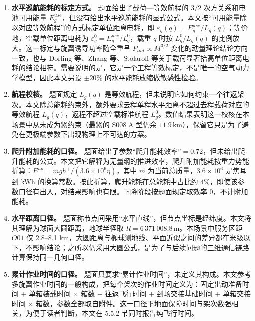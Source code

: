 \documentclass[withoutpreface,bwprint]{format}
\begin{document}
\begin{enumerate}[label=\textbf{假设 \arabic*：}, leftmargin=*]
    \item \textbf{水平巡航能耗的标定方式。} 题面给出了载荷—等效航程的 $3/2$ 次方关系和电池可用能量 $E_g^{use}$，但没有给出水平巡航能耗的显式公式。本文按“可用能量除以对应等效航程”的方式标定单位距离电耗，即 $\varepsilon_g(q)=E_g^{use}/L_g(q)$；等价地，空载单位距离电耗为 $\varepsilon_g^0=E_g^{use}/L_g^0$，载重 $q$ 时按 $L_g^0/L_g(q)$ 的比例放大。这一标定与旋翼诱导功率随全重呈 $P_{ind}\propto M^{3/2}$ 变化的动量理论结论\cite{leishman2006}方向一致，也与 Dorling 等\cite{dorling2017}、Zhang 等\cite{zhang2021}、Stolaroff 等\cite{stolaroff2018}关于载荷显著抬高单位距离电耗的结论相符。需要说明的是，它是一个工程等效标定，不是唯一的空气动力学模型，因此本文另设 $\pm20\%$ 的水平能耗放缩做敏感性检验。

    \item \textbf{航程校核。} 题面规定 $L_g(q)$ 是等效航程，但未说明它如何约束一个往返架次。本文除总能耗约束外，额外要求去程单程水平距离不超过去程载荷对应的等效航程 $L_g(q)$，返程不超过空载标准航程 $L_g^0$。数值结果表明这一校核在本场景中从未成为紧约束（最紧的 S008 A 型仍余 $11.9\,\text{km}$），保留它只是为了避免在更极端参数下出现物理上不可达的方案。

    \item \textbf{爬升附加能耗的口径。} 题面给出了参数“爬升能耗效率”$=0.72$，但未给出爬升能耗的公式。本文把它解释为无量纲的推进效率，爬升附加能耗按重力势能折算：$E^{up}=mgh^+/(3.6\times10^6\eta)$，其中 $m$ 为当前总质量，$3.6\times10^6$ 是焦耳到 kWh 的换算常数。按此折算，爬升能耗在总能耗中占比约 $4\%$，即使该参数口径有出入，对结果影响也有限。下降阶段按题面规定取效率 0，不计附加能耗。

    \item \textbf{水平距离口径。} 题面称节点间采用“水平直线”，但节点坐标是经纬度。本文将其理解为球面大圆距离，地球半径取 $R=6\,371\,008.8\,\text{m}$\cite{sinnott1984}。本场景中服务区距 $O01$ 仅 2.8--8.1 km，大圆距离与椭球测地线\cite{vincenty1975}、平面近似之间的差异都在米级以下，不影响结论；之所以仍采用大圆公式，是为了与后续问题的三维通信链路计算保持同一几何口径。

    \item \textbf{累计作业时间的口径。} 题面只要求“累计作业时间”，未定义其构成。本文参考多旋翼作业时间的一般构成\cite{liu2017}，把每个架次的作业时间定义为：固定出动准备时间 $+$ 单箱装载时间 $\times$ 箱数 $+$ 往返飞行时间 $+$ 到场交接基础时间 $+$ 单箱交接时间 $\times$ 箱数，参数全部取自附件。这一口径下地面保障时间与架次数强相关，为便于读者判断，本文在 5.5.2 节同时报告纯飞行时间。


\end{enumerate}
\end{document}
